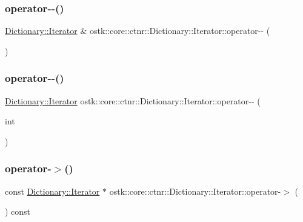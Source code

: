 \subsubsection{\texorpdfstring{operator-\/-\/()}{operator--()}\hspace{0.1cm}{\footnotesize\ttfamily [1/2]}}
{\footnotesize\ttfamily \hyperlink{classostk_1_1core_1_1ctnr_1_1_dictionary_1_1_iterator}{Dictionary\+::\+Iterator} \& ostk\+::core\+::ctnr\+::\+Dictionary\+::\+Iterator\+::operator-\/-\/ (\begin{DoxyParamCaption}{ }\end{DoxyParamCaption})}

\mbox{\label{classostk_1_1core_1_1ctnr_1_1_dictionary_1_1_iterator_a6e2e6ce5737aa845fdc0300f962ac74c}} 
\subsubsection{\texorpdfstring{operator-\/-\/()}{operator--()}\hspace{0.1cm}{\footnotesize\ttfamily [2/2]}}
{\footnotesize\ttfamily \hyperlink{classostk_1_1core_1_1ctnr_1_1_dictionary_1_1_iterator}{Dictionary\+::\+Iterator} ostk\+::core\+::ctnr\+::\+Dictionary\+::\+Iterator\+::operator-\/-\/ (\begin{DoxyParamCaption}\item[{int}]{ }\end{DoxyParamCaption})}

\mbox{\label{classostk_1_1core_1_1ctnr_1_1_dictionary_1_1_iterator_af11668451d7a7da9442a54c820a37666}} 
\subsubsection{\texorpdfstring{operator-\/$>$()}{operator->()}\hspace{0.1cm}{\footnotesize\ttfamily [1/2]}}
{\footnotesize\ttfamily const \hyperlink{classostk_1_1core_1_1ctnr_1_1_dictionary_1_1_iterator}{Dictionary\+::\+Iterator} $\ast$ ostk\+::core\+::ctnr\+::\+Dictionary\+::\+Iterator\+::operator-\/$>$ (\begin{DoxyParamCaption}{ }\end{DoxyParamCaption}) const}

